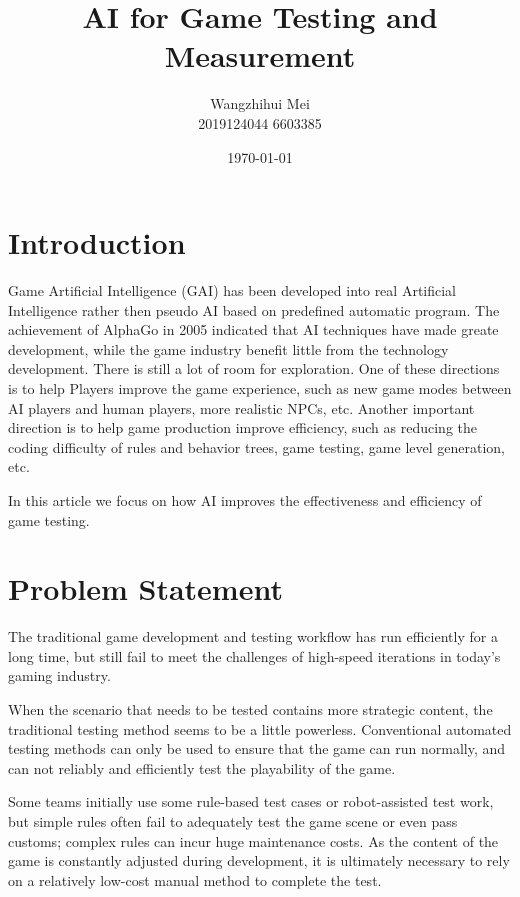 \documentclass[11pt,en,authoryear]{elegantpaper}
\title{ AI for Game Testing and Measurement}
\author{Wangzhihui Mei \\ 2019124044 6603385}
\institute{UOW-CCNU JI}
\date{\today}
\begin{document}
\maketitle

 


\section{Introduction}
\noindent
Game Artificial Intelligence (GAI) has been developed into real Artificial Intelligence rather then pseudo AI based on predefined automatic program. The achievement of AlphaGo in 2005 indicated that AI techniques have made greate development, while the game industry benefit little from the technology development. There is still a lot of room for exploration. One of these directions is to help Players improve the game experience, such as new game modes between AI players and human players, more realistic NPCs, etc. Another important direction is to help game production improve efficiency, such as reducing the coding difficulty of rules and behavior trees, game testing, game level generation, etc.

\noindent
In this article we focus on how AI improves the effectiveness and efficiency of game testing. 

\section{Problem  Statement}
The traditional game development and testing workflow has run efficiently for a long time, but still fail to meet the challenges of high-speed iterations in today's gaming industry.

When the scenario that needs to be tested contains more strategic content, the traditional testing method seems to be a little powerless. Conventional automated testing methods can only be used to ensure that the game can run normally, and can not reliably and efficiently test the playability of the game.

Some teams initially use some rule-based test cases or robot-assisted test work, but simple rules often fail to adequately test the game scene or even pass customs; complex rules can incur huge maintenance costs. As the content of the game is constantly adjusted during development, it is ultimately necessary to rely on a relatively low-cost manual method to complete the test.
\end{document}

